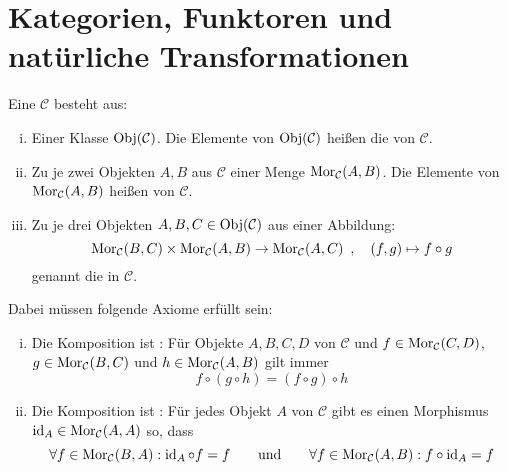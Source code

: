 \tableofcontents
\cleardoubleoddemptypage

\setcounter{page}{1}
\setcounter{footnote}{0}

\section{Kategorien, Funktoren und natürliche Transformationen} %
\label{sec:1}

\begin{definition}[{name=[Kategorie]}]
	Eine  $\mathcal{C}$ besteht aus:
	\begin{enumerate}[i),itemsep=0pt]
		\item Einer Klasse $\operatorname{Obj}(\mathcal{C})$. Die Elemente von $\operatorname{Obj}(\mathcal{C})$ heißen die  von $\mathcal{C}$.
		\item Zu je zwei Objekten $A,B$ aus $\mathcal{C}$ einer Menge $\operatorname{Mor}_{\mathcal{C}}(A,B)$. Die Elemente von $\operatorname{Mor}_\mathcal{C}(A,B)$ heißen  von $\mathcal{C}$.
		\item Zu je drei Objekten $A,B,C \in \operatorname{Obj}(\mathcal{C})$ aus einer Abbildung: 
		\[
			\operatorname{Mor}_\mathcal{C}(B,C) \times \operatorname{Mor}_\mathcal{C}(A,B) \to \operatorname{Mor}_\mathcal{C}(A,C) \enspace, \quad (f,g) \mapsto f \circ g
		\]
		genannt die  in $\mathcal{C}$. 
	\end{enumerate}
	Dabei müssen folgende Axiome  erfüllt sein:
	\begin{enumerate}[(i)]
		\item Die Komposition ist : Für Objekte $A,B,C,D$ von $\mathcal{C}$ und $f \in \operatorname{Mor}_\mathcal{C}(C,D)$, $ g \in \operatorname{Mor}_\mathcal{C}(B,C)$ und $ h \in \operatorname{Mor}_\mathcal{C}(A,B)$ gilt immer
		\[
			f \circ (g \circ h) = (f \circ g) \circ h
		\]
		\item Die Komposition ist : Für jedes Objekt $A$ von $\mathcal{C}$ gibt es einen Morphismus $\operatorname{id}_A \in \operatorname{Mor}_\mathcal{C}(A,A)$ so, dass
		\[
			\forall f \in \operatorname{Mor}_\mathcal{C}(B,A) : \operatorname{id}_A \circ f = f  \qquad  \text{und} \qquad  \forall f \in \operatorname{Mor}_\mathcal{C}(A,B) : f \circ \operatorname{id}_A = f
		\]
	\end{enumerate}
\end{definition}

